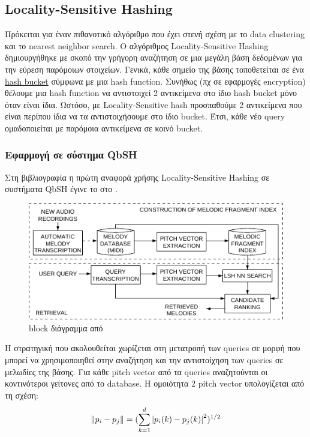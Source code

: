 \newcommand*{\ls}{Locality-Sensitive}%
\newcommand*{\lsh}{Locality-Sensitive Hashing}%
\subsection{\lsh{}}\label{sub:lsh}
Πρόκειται για έναν πιθανοτικό αλγόριθμο που έχει στενή σχέση με το data clustering και το nearest neighbor search.
O αλγόριθμος \lsh{} δημιουργήθηκε με σκοπό την γρήγορη αναζήτηση σε μια μεγάλη βάση δεδομένων για την εύρεση παρόμοιων στοιχείων\cite{slaney2008locality}.
Γενικά, κάθε σημείο της βάσης τοποθετείται σε ένα \href{https://en.wikipedia.org/wiki/Hash_table}{hash bucket} σύμφωνα με μια hash function.
Συνήθως (πχ σε εφαρμογές encryption) θέλουμε μια hash function να αντιστοιχεί 2 αντικείμενα στο ίδιο hash bucket μόνο όταν είναι ίδια.
Ωστόσο, με \ls{} hash προσπαθούμε 2 αντικείμενα που είναι περίπου ίδια να τα αντιστοιχήσουμε στο ίδιο bucket.
Έτσι, κάθε νέο query ομαδοποιείται με παρόμοια αντικείμενα σε κοινό bucket.

\subsubsection{Εφαρμογή σε σύστημα QbSH}
Στη βιβλιογραφία η πρώτη αναφορά χρήσης \lsh{} σε συστήματα QbSH έγινε το \citeyear{ryynanen2008query} στο \cite{ryynanen2008query}.

\begin{figure}
        \centering
        \vspace{-20pt}\includegraphics[width=\linewidth]{ryynanen2008query}
        \vspace{-20pt}\caption{block διάγραμμα από \protect\cite{ryynanen2008query}}
        \label{fig:ryynanen2008query}
\end{figure}

Η στρατηγική που ακολουθείται χωρίζεται στη
μετατροπή των queries σε μορφή που μπορεί να χρησιμοποιηθεί στην αναζήτηση και
την αντιστοίχηση των queries σε μελωδίες της βάσης.
Για κάθε pitch vector από τα queries αναζητούνται οι κοντινότεροι γείτονες από το database.
Η ομοιότητα 2 pitch vector υπολογίζεται από τη σχέση:
\begin{equation*}
\left\lVert p_i - p_j\right\rVert = (\sum\limits_{k=1}^{d}\left\lvert p_i(k) - p_j(k)\right\rvert^2)^{1/2}
\end{equation*}

